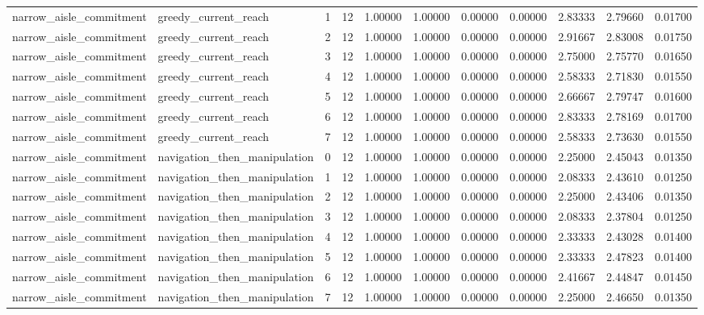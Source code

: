 \documentclass{article}
\begin{document}
\begin{table}[tbp]
{\begin{tabular}{lllllllllll}
narrow\_aisle\_commitment & greedy\_current\_reach & 1 & 12 & 1.00000 & 1.00000 & 0.00000 & 0.00000 & 2.83333 & 2.79660 & 0.01700 \\
narrow\_aisle\_commitment & greedy\_current\_reach & 2 & 12 & 1.00000 & 1.00000 & 0.00000 & 0.00000 & 2.91667 & 2.83008 & 0.01750 \\
narrow\_aisle\_commitment & greedy\_current\_reach & 3 & 12 & 1.00000 & 1.00000 & 0.00000 & 0.00000 & 2.75000 & 2.75770 & 0.01650 \\
narrow\_aisle\_commitment & greedy\_current\_reach & 4 & 12 & 1.00000 & 1.00000 & 0.00000 & 0.00000 & 2.58333 & 2.71830 & 0.01550 \\
narrow\_aisle\_commitment & greedy\_current\_reach & 5 & 12 & 1.00000 & 1.00000 & 0.00000 & 0.00000 & 2.66667 & 2.79747 & 0.01600 \\
narrow\_aisle\_commitment & greedy\_current\_reach & 6 & 12 & 1.00000 & 1.00000 & 0.00000 & 0.00000 & 2.83333 & 2.78169 & 0.01700 \\
narrow\_aisle\_commitment & greedy\_current\_reach & 7 & 12 & 1.00000 & 1.00000 & 0.00000 & 0.00000 & 2.58333 & 2.73630 & 0.01550 \\
narrow\_aisle\_commitment & navigation\_then\_manipulation & 0 & 12 & 1.00000 & 1.00000 & 0.00000 & 0.00000 & 2.25000 & 2.45043 & 0.01350 \\
narrow\_aisle\_commitment & navigation\_then\_manipulation & 1 & 12 & 1.00000 & 1.00000 & 0.00000 & 0.00000 & 2.08333 & 2.43610 & 0.01250 \\
narrow\_aisle\_commitment & navigation\_then\_manipulation & 2 & 12 & 1.00000 & 1.00000 & 0.00000 & 0.00000 & 2.25000 & 2.43406 & 0.01350 \\
narrow\_aisle\_commitment & navigation\_then\_manipulation & 3 & 12 & 1.00000 & 1.00000 & 0.00000 & 0.00000 & 2.08333 & 2.37804 & 0.01250 \\
narrow\_aisle\_commitment & navigation\_then\_manipulation & 4 & 12 & 1.00000 & 1.00000 & 0.00000 & 0.00000 & 2.33333 & 2.43028 & 0.01400 \\
narrow\_aisle\_commitment & navigation\_then\_manipulation & 5 & 12 & 1.00000 & 1.00000 & 0.00000 & 0.00000 & 2.33333 & 2.47823 & 0.01400 \\
narrow\_aisle\_commitment & navigation\_then\_manipulation & 6 & 12 & 1.00000 & 1.00000 & 0.00000 & 0.00000 & 2.41667 & 2.44847 & 0.01450 \\
narrow\_aisle\_commitment & navigation\_then\_manipulation & 7 & 12 & 1.00000 & 1.00000 & 0.00000 & 0.00000 & 2.25000 & 2.46650 & 0.01350 \\

\end{tabular}}
\end{table}
\end{document}
